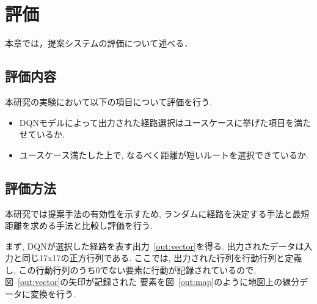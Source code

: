 \chapter{評価}
\label{evaluation}

本章では，提案システムの評価について述べる．


\section{評価内容}

本研究の実験において以下の項目について評価を行う.


\begin{itemize}
    \item DQNモデルによって出力された経路選択はユースケースに挙げた項目を満たせているか.
    \item ユースケース満たした上で, なるべく距離が短いルートを選択できているか.
\end{itemize}



\section{評価方法}

本研究では提案手法の有効性を示すため, ランダムに経路を決定する手法と最短距離を求める手法と比較し評価を行う.

まず, DQNが選択した経路を表す出力~\ref{out:vector}を得る. 出力されたデータは入力と同じ17x17の正方行列である.
ここでは, 出力された行列を行動行列と定義し, この行動行列のうち0でない要素に行動が記録されているので, 図~\ref{out:vector}の矢印が記録された
要素を図~\ref{out:map}のように地図上の線分データに変換を行う.


